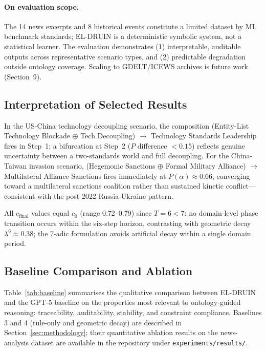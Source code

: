\documentclass{llncs}
\begin{document}
\paragraph{On evaluation scope.}
The 14 news excerpts and 8 historical events constitute a limited dataset by ML benchmark standards; EL-DRUIN is a deterministic symbolic system, not a statistical learner. The evaluation demonstrates (1) interpretable, auditable outputs across representative scenario types, and (2) predictable degradation outside ontology coverage. Scaling to GDELT/ICEWS archives is future work (Section~9).

\subsection{Interpretation of Selected Results}

In the US-China technology decoupling scenario, the composition (Entity-List
Technology Blockade $\oplus$ Tech Decoupling) $\to$ Technology Standards Leadership
fires in Step~1; a bifurcation at Step~2 ($P$ difference $< 0.15$) reflects genuine
uncertainty between a two-standards world and full decoupling.
For the China-Taiwan invasion scenario, (Hegemonic Sanctions $\oplus$ Formal Military
Alliance) $\to$ Multilateral Alliance Sanctions fires immediately at $P(\alpha)
\approx 0.66$, converging toward a multilateral sanctions coalition rather than
sustained kinetic conflict---consistent with the post-2022 Russia-Ukraine pattern.

All $c_{\mathrm{final}}$ values equal $c_0$ (range 0.72--0.79) since $T=6 < 7$:
no domain-level phase transition occurs within the six-step horizon, contrasting
with geometric decay $\lambda^6 \approx 0.38$; the 7-adic formulation avoids
artificial decay within a single domain period.

\subsection{Baseline Comparison and Ablation}

Table~\ref{tab:baseline} summarises the qualitative comparison between EL-DRUIN
and the GPT-5 baseline on the properties most relevant to ontology-guided
reasoning: traceability, auditability, stability, and constraint compliance.
Baselines 3 and 4 (rule-only and geometric decay) are described in
Section~\ref{sec:methodology}; their quantitative ablation results on the
news-analysis dataset are available in the repository under
\texttt{experiments/results/}.
\end{document}
